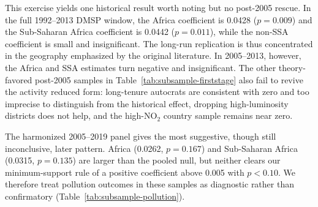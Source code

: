 \documentclass[9pt,twocolumn,twoside]{pnas-new}
\begin{document}
This exercise yields one historical result worth noting but no post-2005 rescue. In the full 1992--2013 DMSP window, the Africa coefficient is 0.0428 ($p = 0.009$) and the Sub-Saharan Africa coefficient is 0.0442 ($p = 0.011$), while the non-SSA coefficient is small and insignificant. The long-run replication is thus concentrated in the geography emphasized by the original literature. In 2005--2013, however, the Africa and SSA estimates turn negative and insignificant. The other theory-favored post-2005 samples in Table~\ref{tab:subsample-firststage} also fail to revive the activity reduced form: long-tenure autocrats are consistent with zero and too imprecise to distinguish from the historical effect, dropping high-luminosity districts does not help, and the high-NO$_2$ country sample remains near zero.

The harmonized 2005--2019 panel gives the most suggestive, though still inconclusive, later pattern. Africa (0.0262, $p = 0.167$) and Sub-Saharan Africa (0.0315, $p = 0.135$) are larger than the pooled null, but neither clears our minimum-support rule of a positive coefficient above 0.005 with $p < 0.10$. We therefore treat pollution outcomes in these samples as diagnostic rather than confirmatory (Table~\ref{tab:subsample-pollution}).
\end{document}
